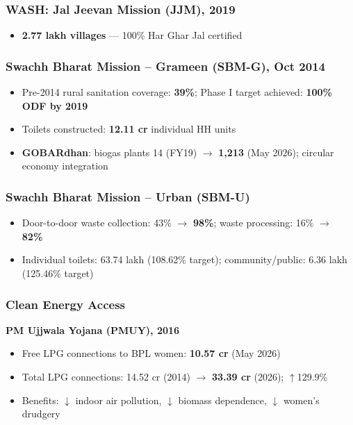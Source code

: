 \subsubsection*{WASH: Jal Jeevan Mission (JJM), 2019}
\begin{itemize}
  \item \textbf{2.77 lakh villages} --- 100\% Har Ghar Jal certified
\end{itemize}

\subsubsection*{Swachh Bharat Mission -- Grameen (SBM-G), Oct 2014}
\begin{itemize}
  \item Pre-2014 rural sanitation coverage: \textbf{39\%}; Phase I target achieved: \textbf{100\% ODF by 2019}
  \item Toilets constructed: \textbf{12.11 cr} individual HH units
  \item \textbf{GOBARdhan}: biogas plants 14 (FY19) $\rightarrow$ \textbf{1,213} (May 2026); circular economy integration
\end{itemize}

\subsubsection*{Swachh Bharat Mission -- Urban (SBM-U)}
\begin{itemize}
  \item Door-to-door waste collection: 43\% $\rightarrow$ \textbf{98\%}; waste processing: 16\% $\rightarrow$ \textbf{82\%}
  \item Individual toilets: 63.74 lakh (108.62\% target); community/public: 6.36 lakh (125.46\% target)
\end{itemize}

\subsubsection*{Clean Energy Access}
\textbf{PM Ujjwala Yojana (PMUY), 2016}
\begin{itemize}
  \item Free LPG connections to BPL women: \textbf{10.57 cr} (May 2026)
  \item Total LPG connections: 14.52 cr (2014) $\rightarrow$ \textbf{33.39 cr} (2026); $\uparrow$129.9\%
  \item Benefits: $\downarrow$ indoor air pollution, $\downarrow$ biomass dependence, $\downarrow$ women's drudgery
\end{itemize}

